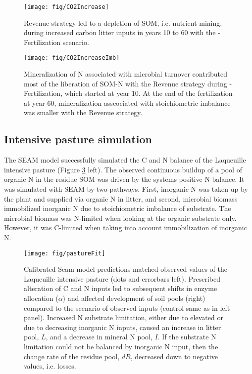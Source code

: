 \begin{figure}[t] \vspace*{2mm}
\begin{center}
\texttt{[image: fig/CO2Increase]}
\end{center}
\caption{
Revenue strategy led to a depletion of SOM, i.e.
nutrient mining, during increased carbon litter inputs
in years 10 to 60 with the -Fertilization scenario.
\label{fig:CO2Increase}}

\end{figure}
\begin{figure}[t] \vspace*{2mm}
\begin{center}
\texttt{[image: fig/CO2IncreaseImb]} 
\end{center}
\caption{
Mineralization of N associated with microbial turnover 
contributed most of the liberation of SOM-N with the Revenue strategy during
-Fertilization, which started at year 10.
At the end of the fertilization at year 60, mineralization asscociated 
with stoichiometric imbalance was smaller with the Revenue strategy.
\label{fig:CO2IncreaseImb}}
\end{figure}

\subsection{Intensive pasture simulation}
\label{sec:ResultsPasture}

The SEAM model successfully simulated the C and N balance of the Laqueuille
intensive pasture (Figure \ref{fig:pastureFit} left). The observed continuous
buildup of a pool of organic N in the residue SOM was driven by the systems
positive N balance. It was simulated with SEAM by two pathways. First, inorganic
N was taken up by the plant and supplied via organic N in litter, and second,
microbial biomass immobilized inorganic N due to stoichiometric imbalance of
substrate. The microbial biomass was N-limited when looking at the organic
substrate only. However, it was C-limited when taking into account
immobilization of inorganic N.

\begin{figure}[t] \vspace*{2mm}
\begin{center}
\texttt{[image: fig/pastureFit]} 
\end{center}
\caption{
Calibrated Seam model predictions matched observed values of the Laqueuille
intensive pasture (dots and errorbars left). Prescribed alteration of C and N
inputs led to subsequent shifts in enzyme allocation ($\alpha$) and affected
development of soil pools (right) compared to the scenario of observed inputs
(control same as in left panel).
Increased N substrate limitation, either due to elevated  or due to
decreasing inorganic N inputs, caused an increase in litter pool, $L$, and a
decrease in mineral N pool, $I$. If the substrate N limitation could not be
balanced by inorganic N input, then the change rate of the residue pool, $dR$,
decreased down to negative values, i.e. losses.
\label{fig:pastureFit} 
}
\end{figure}   

